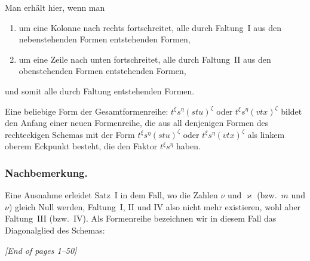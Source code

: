\documentclass[11pt,a4paper]{article}
\theoremstyle{plain}
\theoremstyle{definition}
\begin{document}
Man erh\"alt hier, wenn man
\begin{enumerate}[label=\arabic*)]
\item um eine Kolonne nach rechts fortschreitet, alle durch Faltung~I aus den nebenstehenden Formen entstehenden Formen,
\item um eine Zeile nach unten fortschreitet, alle durch Faltung~II aus den obenstehenden Formen entstehenden Formen,
\end{enumerate}
und somit alle durch Faltung entstehenden Formen.

Eine beliebige Form der Gesamtformenreihe: $t^\xi s^\eta (stu)^\zeta$ oder $t^\xi s^\eta (vtx)^\zeta$ bildet den Anfang einer neuen Formenreihe, die aus all denjenigen Formen des rechteckigen Schemas mit der Form $t^\xi s^\eta (stu)^\zeta$ oder $t^\xi s^\eta (vtx)^\zeta$ als linkem oberem Eckpunkt besteht, die den Faktor $t^\xi s^\eta$ haben.

\subsubsection*{Nachbemerkung.}

Eine Ausnahme erleidet Satz~I in dem Fall, wo die Zahlen $\nu$ und $\varkappa$ (bzw.~$m$ und $\nu$) gleich Null werden, Faltung~I, II und IV also nicht mehr existieren, wohl aber Faltung~III (bzw.~IV). Als Formenreihe bezeichnen wir in diesem Fall das Diagonalglied des Schemas:

\begin{center}
\end{center}

\vfill
\begin{center}
\textit{[End of pages 1--50]}
\end{center}
\clearpage
\end{document}
